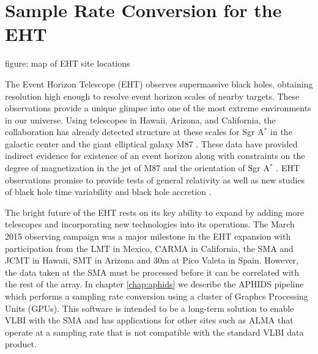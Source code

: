 \section{Sample Rate Conversion for the EHT}

figure: map of EHT site locations

The Event Horizon Telescope (EHT) observes supermassive black holes, obtaining resolution high enough
to resolve event horizon scales of nearby targets.  These observations provide a 
unique glimpse into one of the most extreme environments in our universe.  Using telescopes in Hawaii, Arizona, 
and California, the collaboration has already detected structure at these scales for Sgr A$^\ast$ in the galactic 
center and the giant elliptical galaxy M87 \citep{doeleman08,doeleman09}.  These data have provided indirect 
evidence for existence of an event horizon \citep{broderick15} along with constraints on the degree of 
magnetization in the jet of M87 \citep{kino15} and the orientation of Sgr A$^\ast$ \citep{broderick11}.  EHT 
observations promise to provide tests of general relativity \citep{luminet79,johannsen10,bambi13,broderick14} as 
well as new studies of black hole time variability \citep{doeleman09} and black hole accretion \citep{chan15}.

The bright future of the EHT rests on its key ability to expand by adding more telescopes and
incorporating new technologies into its operations.  The March 2015 observing campaign was a major milestone in
the EHT expansion with participation from the LMT in Mexico, CARMA in California, the SMA and JCMT in Hawaii, 
SMT in Arizona and 30m at Pico Valeta in Spain.  However, the data taken at the SMA must be processed before it
can be correlated with the rest of the array.  In chapter \ref{chap:aphids} we describe the APHIDS pipeline
which performs a sampling rate conversion using a cluster of Graphcs Processing Units (GPUs).  This software
is intended to be a long-term solution to enable VLBI with the SMA and has applications for other sites such 
as ALMA that operate at a sampling rate that is not compatible with the standard VLBI data product.

